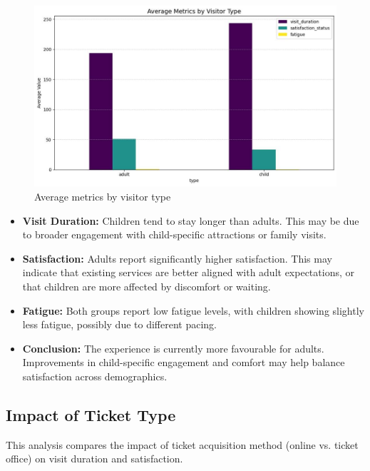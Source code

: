 \documentclass[12pt]{article}
\begin{document}
\begin{figure}[H]
    \centering
    \includegraphics[width=1\textwidth]{average_visitor_type.png}
    \caption{Average metrics by visitor type}
    \label{fig:average_visitor_type}
\end{figure}

\begin{itemize}
    \item \textbf{Visit Duration:} Children tend to stay longer than adults. This may be due to broader engagement with child-specific attractions or family visits.
    \item \textbf{Satisfaction:} Adults report significantly higher satisfaction. This may indicate that existing services are better aligned with adult expectations, or that children are more affected by discomfort or waiting.
    \item \textbf{Fatigue:} Both groups report low fatigue levels, with children showing slightly less fatigue, possibly due to different pacing.
    \item \textbf{Conclusion:} The experience is currently more favourable for adults. Improvements in child-specific engagement and comfort may help balance satisfaction across demographics.
\end{itemize}

\subsection{Impact of Ticket Type}
This analysis compares the impact of ticket acquisition method (online vs. ticket office) on visit duration and satisfaction.
\end{document}
